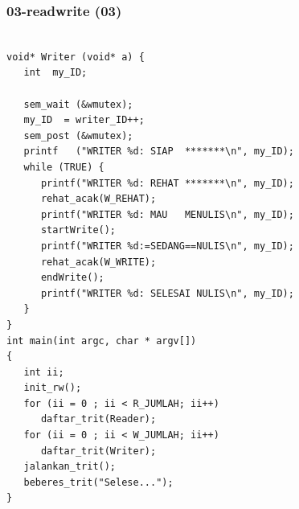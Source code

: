 \documentclass[aspectratio=169, xcolor=table, notheorems, hyperref={pdfpagelabels=false}]{beamer}
\begin{document}
\begin{frame}[fragile]
\frametitle{03-readwrite (03)}
\begin{lstlisting}[basicstyle=\ttfamily\tiny]

void* Writer (void* a) {
   int  my_ID;

   sem_wait (&wmutex);
   my_ID  = writer_ID++;
   sem_post (&wmutex);
   printf   ("WRITER %d: SIAP  *******\n", my_ID);
   while (TRUE) {
      printf("WRITER %d: REHAT *******\n", my_ID);
      rehat_acak(W_REHAT);
      printf("WRITER %d: MAU   MENULIS\n", my_ID);
      startWrite();
      printf("WRITER %d:=SEDANG==NULIS\n", my_ID);
      rehat_acak(W_WRITE);
      endWrite();
      printf("WRITER %d: SELESAI NULIS\n", my_ID);
   }
}
int main(int argc, char * argv[])
{
   int ii;
   init_rw();
   for (ii = 0 ; ii < R_JUMLAH; ii++)
      daftar_trit(Reader);
   for (ii = 0 ; ii < W_JUMLAH; ii++)
      daftar_trit(Writer);
   jalankan_trit();
   beberes_trit("Selese...");
}

\end{lstlisting}
\end{frame}
\end{document}
